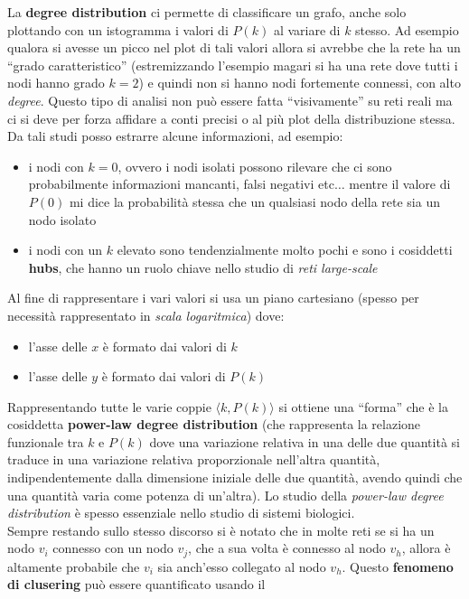 \documentclass[a4paper,12pt, oneside]{book}
\begin{document}
La \textbf{degree distribution} ci permette di classificare un grafo, anche
solo plottando con un istogramma i valori di $P(k)$ al variare di $k$
stesso. Ad esempio qualora si avesse un picco nel plot di tali valori allora si
avrebbe che la rete ha un ``grado caratteristico'' (estremizzando l'esempio
magari si ha una rete dove tutti i nodi hanno grado $k=2$) e quindi non si hanno
nodi fortemente connessi, con alto \textit{degree}. Questo tipo di analisi non
può essere fatta ``visivamente'' su reti reali ma ci si deve per forza affidare
a conti precisi o al più plot della distribuzione stessa. Da tali studi posso
estrarre alcune informazioni, ad esempio:
\begin{itemize}
  \item i nodi con $k=0$, ovvero i nodi isolati possono rilevare che ci sono
  probabilmente informazioni mancanti, falsi negativi etc$\ldots$ mentre il
  valore di $P(0)$ mi dice la probabilità stessa che un qualsiasi nodo della
  rete sia un nodo isolato
  \item i nodi con un $k$ elevato sono tendenzialmente molto pochi e sono i
  cosiddetti \textbf{hubs}, che hanno un ruolo chiave nello studio di
  \textit{reti large-scale} 
\end{itemize}
Al fine di rappresentare i vari valori si usa un piano cartesiano (spesso per
necessità rappresentato in \textit{scala logaritmica}) dove:
\begin{itemize}
  \item l'asse delle $x$ è formato dai valori di $k$
  \item l'asse delle $y$ è formato dai valori di $P(k)$
\end{itemize}
Rappresentando tutte le varie coppie $\langle k,P(k)\rangle$ si ottiene una
``forma'' che è la cosiddetta \textbf{power-law degree distribution} (che
rappresenta la relazione funzionale tra $k$ e $P(k)$ dove una variazione
relativa in una delle due quantità si traduce in una variazione relativa
proporzionale nell'altra quantità, indipendentemente dalla dimensione iniziale
delle due quantità, avendo quindi che una quantità varia come potenza di
un'altra). Lo studio della \textit{power-law degree distribution} è spesso
essenziale nello studio di sistemi biologici.\\
Sempre restando sullo stesso discorso si è notato che in molte reti se si ha un
nodo $v_i$ connesso con un nodo $v_j$, che a sua volta è connesso al nodo $v_h$,
allora è altamente probabile che $v_i$ sia anch'esso collegato al nodo
$v_h$. Questo \textbf{fenomeno di clusering} può essere quantificato usando il
\end{document}
